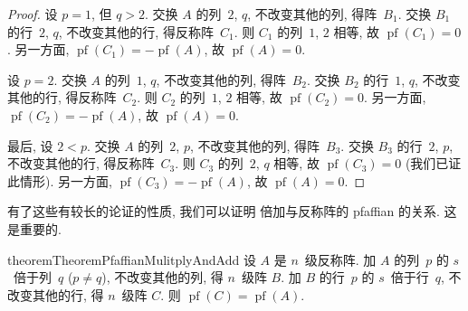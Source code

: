 \begin{proof}
    设 \(p = 1\), 但 \(q > 2\).
    交换 \(A\) 的列~\(2\), \(q\), 不改变其他的列, 得阵~\(B_1\).
    交换 \(B_1\) 的行~\(2\), \(q\), 不改变其他的行,
    得反称阵~\(C_1\).
    则 \(C_1\) 的列~\(1\), \(2\) 相等,
    故 \(\operatorname{pf} {(C_1)} = 0\).
    另一方面, \(\operatorname{pf} {(C_1)}
    = -\operatorname{pf} {(A)}\),
    故 \(\operatorname{pf} {(A)} = 0\).

    设 \(p = 2\).
    交换 \(A\) 的列~\(1\), \(q\), 不改变其他的列, 得阵~\(B_2\).
    交换 \(B_2\) 的行~\(1\), \(q\), 不改变其他的行,
    得反称阵~\(C_2\).
    则 \(C_2\) 的列~\(1\), \(2\) 相等,
    故 \(\operatorname{pf} {(C_2)} = 0\).
    另一方面, \(\operatorname{pf} {(C_2)}
    = -\operatorname{pf} {(A)}\),
    故 \(\operatorname{pf} {(A)} = 0\).

    最后, 设 \(2 < p\).
    交换 \(A\) 的列~\(2\), \(p\), 不改变其他的列, 得阵~\(B_3\).
    交换 \(B_3\) 的行~\(2\), \(p\), 不改变其他的行,
    得反称阵~\(C_3\).
    则 \(C_3\) 的列~\(2\), \(q\) 相等,
    故 \(\operatorname{pf} {(C_3)} = 0\)
    (我们已证此情形).
    另一方面, \(\operatorname{pf} {(C_3)}
    = -\operatorname{pf} {(A)}\),
    故 \(\operatorname{pf} {(A)} = 0\).
\end{proof}

有了这些有较长的论证的性质, 我们可以证明%
倍加与反称阵的 pfaffian 的关系.
这是重要的.

\begin{restatable}{theorem}{TheoremPfaffianMulitplyAndAdd}
    设 \(A\) 是 \(n\)~级反称阵.
    加 \(A\) 的列~\(p\) 的 \(s\)~倍于列~\(q\)
    (\(p \neq q\)),
    不改变其他的列, 得 \(n\)~级阵 \(B\).
    加 \(B\) 的行~\(p\) 的 \(s\)~倍于行~\(q\),
    不改变其他的行, 得 \(n\)~级阵 \(C\).
    则 \(\operatorname{pf} {(C)} = \operatorname{pf} {(A)}\).
\end{restatable}

